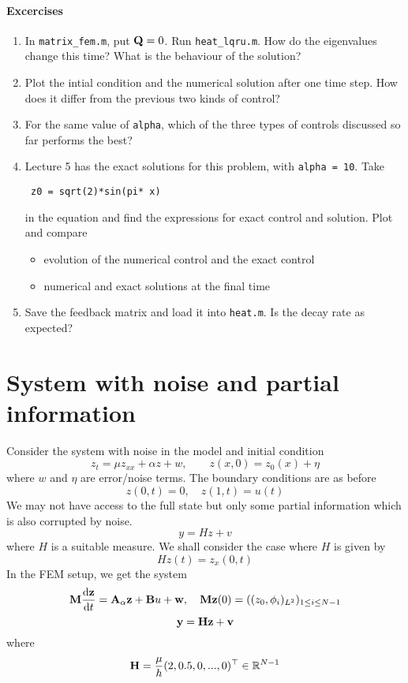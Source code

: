 \documentclass[12pt]{article}
\begin{document}
\paragraph{Excercises}

\begin{enumerate}

\item In {\tt matrix\_fem.m}, put ${\mathbf Q} = 0$. Run {\tt heat\_lqru.m}. How do the eigenvalues change this time? What is the behaviour of the solution?

\item Plot the intial condition and the numerical solution after one time step. How does it differ from the previous two kinds of control?

\item For the same value of {\tt alpha}, which of the three types of controls discussed so far performs the best?

\item Lecture 5 has the exact solutions for this problem, with {\tt alpha = 10}. Take 
\begin{lstlisting}
 z0 = sqrt(2)*sin(pi* x) 
\end{lstlisting}
in the equation and find the expressions for exact control and solution. Plot and compare 
\begin{itemize}
 \item evolution of the numerical control and the exact control 
 \item numerical and exact solutions at the final time
\end{itemize}

\item Save the feedback matrix and load it into {\tt heat.m}. Is the decay rate as expected?
\end{enumerate}


\section{System with noise and partial information}
Consider the system with noise in the model and initial condition
\[
z_t = \mu z_{xx} + \alpha z + w, \qquad z(x,0) = z_0(x) + \eta
\]
where $w$ and $\eta$ are error/noise terms. The boundary conditions are as before
\[
z(0,t) = 0, \quad z(1,t) = u(t)
\]
We may not have access to the full state but only some partial information which is also corrupted by noise.
\[
y = Hz  + v
\]
where $H$ is a suitable measure. We shall consider the case where $H$ is given by
\[
 Hz(t) = z_x(0,t)
\]
In the FEM setup, we get the system
\[
 {\mathbf M} \frac{\textrm{d} {\mathbf z}}{\textrm{d} t} = {\mathbf A}_\alpha {\mathbf z} + {\mathbf B} u + {\mathbf w} , \quad {\mathbf M} {\mathbf z}(0) = ((z_0,\phi_i)_{L^2})_{1\le i \le {N-1}}
\]
\[
 {\mathbf y} = {\mathbf H} {\mathbf z} + {\mathbf v}
\]
where 
\[
 {\mathbf H} = \frac{\mu}{h}(2,0.5,0,...,0)^\top \in \mathbb{R}^{N-1}
\]
\end{document}
